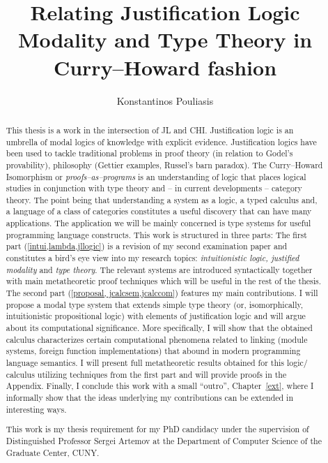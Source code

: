 \documentclass[12pt]{report}
\title{Relating Justification Logic Modality and Type Theory in Curry--Howard fashion}
\author{Konstantinos Pouliasis}
\begin{document}
\maketitle


\begin{abstract}
This thesis is a work in the intersection of \ac{JL} and \ac{CHI}. Justification logic is an umbrella of modal logics of knowledge with explicit evidence. 
Justification logics have been used to tackle traditional problems in proof theory (in relation to Godel's provability), philosophy (Gettier examples, Russel's barn paradox). 
The Curry--Howard Isomorphism or \emph{proofs--as--programs} is an understanding of logic that places logical studies in conjunction with type theory and -- in current developments -- 
category theory. The point being that  understanding a system as a logic, a typed calculus and,  a language of a class of categories constitutes a useful discovery 
that can have many applications.
The application  we will be mainly concerned  is type systems for useful programming language constructs. 
This work  is structured in three parts: 
The first part (\cref{intui,lambda,jllogic}) is a revision of my second examination paper and constitutes 
a bird's eye view into my 
research topics:  
\emph{intuitionistic logic, justified modality} and \emph{type theory}. 
The relevant systems are introduced syntactically together with main 
 metatheoretic proof techniques which will be useful 
in the rest of the thesis.
The second part (\cref{proposal, jcalcsem,jcalccom}) 
features my main contributions.
I will propose  
a modal type system that extends simple type theory
 (or, isomorphically, intuitionistic propositional logic) with elements of
 justification logic and will argue about its computational significance. 
 More specifically, I will show  
that the obtained calculus characterizes  certain 
computational phenomena related to linking (module systems, foreign function implementations) 
that abound in modern programming language semantics. 
I will present full metatheoretic
results obtained for this logic/ calculus utilizing techniques from the first part 
and will provide proofs in the Appendix. 
Finally, I conclude this work with a small ``outro'', Chapter~\ref{ext},
where I informally show that the ideas underlying my contributions 
can be extended in interesting ways.

This work is my thesis requirement for my PhD candidacy under the supervision of Distinguished Professor Sergei Artemov at the Department of 
Computer Science of the Graduate Center, CUNY.
\end{abstract}

\tableofcontents








\begin{appendices}

\end{appendices}




\nocite{Pfenning2009a, Pfenning2009b}




\end{document}
